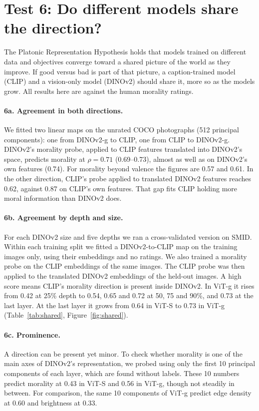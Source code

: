 \documentclass[11pt]{article}
\begin{document}
\section{Test 6: Do different models share the direction?}\label{sec:shared}

The Platonic Representation Hypothesis \cite{huh2024} holds that models trained on different data and objectives converge toward a shared picture of the world as they improve. If good versus bad is part of that picture, a caption-trained model (CLIP) and a vision-only model (DINOv2) should share it, more so as the models grow. All results here are against the human morality ratings.

\paragraph{6a. Agreement in both directions.} We fitted two linear maps on the unrated COCO photographs (512 principal components): one from DINOv2-g to CLIP, one from CLIP to DINOv2-g. DINOv2's morality probe, applied to CLIP features translated into DINOv2's space, predicts morality at $\rho=0.71$ (0.69--0.73), almost as well as on DINOv2's own features (0.74). For morality beyond valence the figures are 0.57 and 0.61. In the other direction, CLIP's probe applied to translated DINOv2 features reaches 0.62, against 0.87 on CLIP's own features. That gap fits CLIP holding more moral information than DINOv2 does.

\paragraph{6b. Agreement by depth and size.} For each DINOv2 size and five depths we ran a cross-validated version on SMID. Within each training split we fitted a DINOv2-to-CLIP map on the training images only, using their embeddings and no ratings. We also trained a morality probe on the CLIP embeddings of the same images. The CLIP probe was then applied to the translated DINOv2 embeddings of the held-out images. A high score means CLIP's morality direction is present inside DINOv2. In ViT-g it rises from 0.42 at 25\% depth to 0.54, 0.65 and 0.72 at 50, 75 and 90\%, and 0.73 at the last layer. At the last layer it grows from 0.64 in ViT-S to 0.73 in ViT-g (Table~\ref{tab:shared}, Figure~\ref{fig:shared}).

\paragraph{6c. Prominence.} A direction can be present yet minor. To check whether morality is one of the main axes of DINOv2's representation, we probed using only the first 10 principal components of each layer, which are found without labels. These 10 numbers predict morality at 0.43 in ViT-S and 0.56 in ViT-g, though not steadily in between. For comparison, the same 10 components of ViT-g predict edge density at 0.60 and brightness at 0.33.
\end{document}
